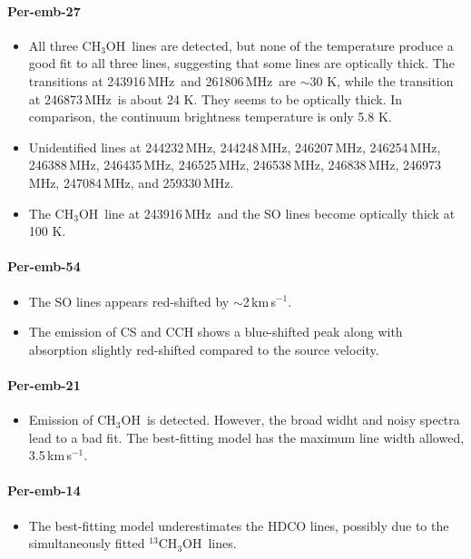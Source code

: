 \documentclass[twocolumn]{aastex62}
\newcommand{\kms}{\mbox{\,km\,s$^{-1}$}}
\newcommand{\mhz}{\mbox{\,MHz}}
\newcommand{\methanol}{\mbox{CH$_{3}$OH}}
\newcommand{\tmethanol}{\mbox{$^{13}$CH$_{3}$OH}}
\begin{document}
\paragraph{Per-emb-27}
\begin{itemize}
  \item All three \methanol\ lines are detected, but none of the temperature produce a good fit to all three lines, suggesting that some lines are optically thick.  The transitions at 243916\mhz\ and 261806\mhz\ are $\sim$30 K, while the transition at 246873\mhz\ is about 24 K.  They seems to be optically thick.  In comparison, the continuum brightness temperature is only 5.8 K.
  \item Unidentified lines at 244232\mhz, 244248\mhz, 246207\mhz, 246254\mhz, 246388\mhz, 246435\mhz, 246525\mhz, 246538\mhz, 246838\mhz, 246973\mhz, 247084\mhz, and 259330\mhz.
  \item The \methanol\ line at 243916\mhz\ and the SO lines become optically thick at 100 K.
\end{itemize}

\paragraph{Per-emb-54}
\begin{itemize}
  \item The SO lines appears red-shifted by $\sim$2\kms.
  \item The emission of CS and CCH shows a blue-shifted peak along with absorption slightly red-shifted compared to the source velocity.
\end{itemize}

\paragraph{Per-emb-21}
\begin{itemize}
  \item Emission of \methanol\ is detected.  However, the broad widht and noisy spectra lead to a bad fit.  The best-fitting model has the maximum line width allowed, 3.5\kms.
\end{itemize}

\paragraph{Per-emb-14}
\begin{itemize}
  \item The best-fitting model underestimates the HDCO lines, possibly due to the simultaneously fitted \tmethanol\ lines.
\end{itemize}
\end{document}
